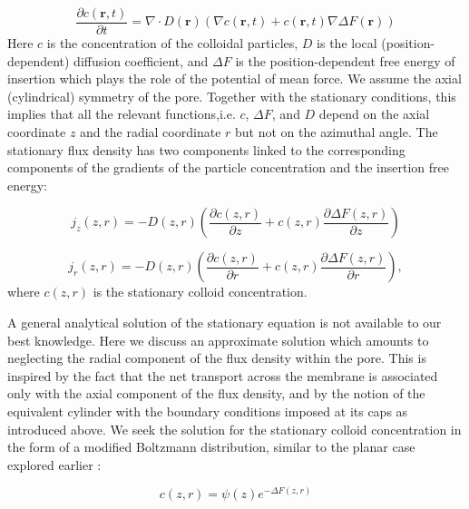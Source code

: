 \documentclass[12pt, a4paper]{article}
\begin{document}
\begin{equation}
    \frac{\partial c(\textbf{r},t)}{\partial t}=\nabla\cdotp D(\textbf{r})\left(\nabla c(\textbf{r},t)+c(\textbf{r},t)\nabla\Delta F(\textbf{r})\right)
    \label{eq:smoluchowsky}
\end{equation}
Here $c$ is the concentration of the colloidal particles, $D$ is the local (position-dependent) diffusion coefficient, and $\Delta F$ is the position-dependent free energy of insertion which plays the role of the potential of mean force.
We assume the axial (cylindrical) symmetry of the pore. Together with the stationary conditions, this implies that all the relevant functions,i.e. $c$, $\Delta F$, and $D$ depend on the axial coordinate $z$ and the radial coordinate $r$ but not on the azimuthal angle.
The stationary flux density has two components linked to the corresponding components of the gradients of the particle concentration and the insertion free energy:


\begin{equation}
j_{z}(z,r)=-D(z,r)\left(\frac{\partial c(z,r)}{\partial z}+c(z,r)\frac{\partial\Delta F(z,r)}{\partial z}\right)\label{eq:flux_axial}
\end{equation}

\begin{equation}
j_{r}(z,r)=-D(z,r)\left(\frac{\partial c(z,r)}{\partial r}+c(z,r)\frac{\partial\Delta F(z,r)}{\partial r}\right),
\label{eq:flux_radial}
\end{equation}
\noindent where $c(z,r)$ is the stationary colloid concentration.

A general analytical solution of the stationary equation is not available to our best knowledge. Here we discuss an approximate solution which amounts to neglecting the radial component of the flux density within the pore. This is inspired by the fact that the net transport across the membrane is associated only with the axial component of the flux density, and by the notion of the equivalent cylinder with the boundary conditions imposed at its caps as introduced above. 
We seek the solution for the stationary colloid concentration in the form of a modified Boltzmann distribution, similar to the planar case explored earlier \cite{Laktionov2023}:                                                         

\begin{equation}
c(z,r)=\psi(z)e^{-\Delta F(z,r)}\label{eq:stationary_c_ansatz}
\end{equation}
\end{document}
